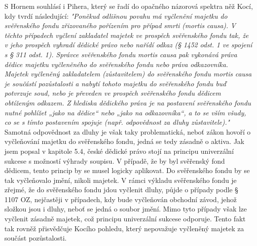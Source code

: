 \documentclass{article}
\begin{document}
 S Hornem souhlásí i Pihera, který se řadí do opačného názorová spektra něž Kocí, kdy tvrdí následující: \textit{"Poněkud odlišnou povahu má vyčlenění majetku do svěřenského fondu zřizovaného pořízením pro případ smrti (mortis causa). V těchto případech vyčlení zakladatel majetek ve prospěch svěřenského fondu tak, že v jeho prospěch vyhradí dědické právo nebo nařídí odkaz (§ 1452 odst. 1 ve spojení s § 311 odst. 1). Správce svěřenského fondu mortis causa pak vykonává práva dědice majetku vyčleněného do svěřenského fondu nebo práva odkazovníka. Majetek vyčleněný zakladatelem (zůstavitelem) do svěřenského fondu mortis causa je součástí pozůstalosti a nabytí tohoto majetku do svěřenského fondu buď potvrzuje soud, nebo je převeden ve prospěch svěřenského fondu dědicem obtíženým odkazem. Z hlediska dědického práva je na postavení svěřenského fondu nutné pohlížet „jako na dědice“ nebo „jako na odkazovníka“, a to se vším všudy, co se s tímto postavením spojuje (např. odpovědnost za dluhy zůstavitele)."}\\
 
 Samotná odpovědnost za dluhy je však taky problematická, neboť zákon hovoří o vyčleňování majetku do svěřenského fondu, jedná se tedy zásadně o aktiva. Jak jsem popsal v kapitole 5.4, české dědické právo stojí na principu univerzální sukcese s možností výhrady soupisu. V případě, že by byl svěřenský fond dědicem, tento princip by se musel logicky aplikovat. Do svěřenského fondu by se tak vyčleňovalo jmění, nikoli majetek. V rámci výkladu svěřenského fondu je zřejmé, že do svěřenského fondu jdou vyčlenit dluhy, půjde o případy podle § 1107 OZ, nejčastěji v případech, kdy bude vyčleňován obchodní závod, jehož složkou jsou i dluhy, neboť se jedná o soubor jmění. Mimo tyto případy však lze vyčlenit zásadně majetek, což principu univerzální sukcese odporuje. Tento fakt tak rovněž přisvědčuje Kocího pohledu, který nepovažuje vyčleněný majetek za součást pozůstalosti.\\
 
\end{document}
